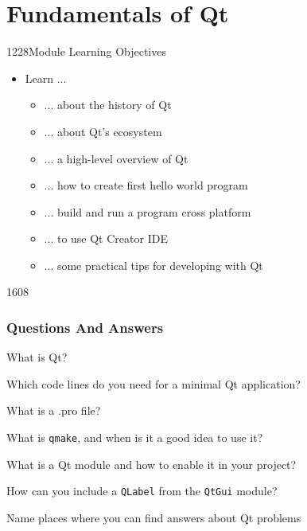 %
%
%
%

\section{Fundamentals of Qt}

\begin{slide}{1228}{Module Learning Objectives}
  \label{fundamentals}
  \begin{itemize}
  \item Learn ...
    \begin{itemize}
    \item ... about the history of Qt
    \item ... about Qt's ecosystem
    \item ... a high-level overview of Qt
    \item ... how to create first hello world program
    \item ... build and run a program cross platform
    \item ... to use Qt Creator IDE
    \item ... some practical tips for developing with Qt
    \end{itemize}
  \end{itemize}
\end{slide}







\begin{slide}{1608}
  \frametitle{Questions And Answers}
  \begin{questionize}
  \item What is Qt?
  \item Which code lines do you need for a minimal Qt application?
  \item What is a .pro file?
  \item What is \texttt{qmake}, and when is it a good idea to use it?
  \item What is a Qt module and how to enable it in your project?
  \item How can you include a \texttt{QLabel} from the \texttt{QtGui} module?
  \item Name places where you can find answers about Qt problems
  \end{questionize}
\end{slide}



% 
